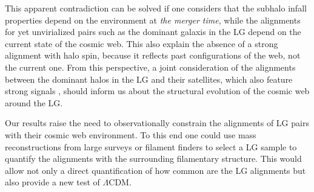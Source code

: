 \documentclass{emulateapj}
\begin{document}
This apparent contradiction can be solved if one considers that the
subhalo infall properties depend on the environment at {\it the
  merger time}, while the alignments for yet unvirialized pairs such
as the dominant galaxis in the LG depend on the current state of the
cosmic web. This also explain the absence of a strong alignment with
halo spin, because it reflects past configurations of the web, not the
current one. From this perspective, a joint consideration of the
alignments between the dominant halos in the LG and their satellites,
which also feature strong signals
\citep{2005A&A...431..517K,Pawlowski2013,Shaya2013}, should inform us
about the structural evolution of the cosmic web around the LG.   

Our results raise the need to observationally constrain the
alignments of LG pairs with their cosmic web environment. To this end
one could use mass reconstructions from large surveys
\citep{2009MNRAS.394..398W,2011MNRAS.417.1303M,2014MNRAS.445..988N,
  2014ApJ...794...94W} or filament finders
\citep{2010MNRAS.407.1449G,2011MNRAS.414..350S} to select a LG sample
to quantify the alignments with the surrounding filamentary
structure. This would allow not only a direct quantification of how
common are the LG alignments but also provide a new test of
$\Lambda$CDM. 
\end{document}
